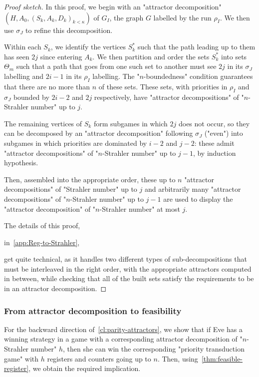 \documentclass[a4paper,UKenglish,cleveref, autoref, thm-restate]{lipics-v2021}
\newif\ificalp
\begin{document}
\begin{proof}[Proof sketch]
In this proof, we begin with an "attractor decomposition" $(H,A_0, (S_k,A_k,D_k)_{k<\kappa})$ of $G_I$, the graph $G$ labelled by the run $\rho_I$. We then use $\sigma_J$ to refine this decomposition.

Within each $S_k$, we identify the vertices $S^*_k$ such that the path leading up to them has seen $2j$ since entering $A_k$. We then partition and order the sets $S^*_k$ into sets $\Theta_m$ such that a path that goes from one such set to another must see $2j$ in its $\sigma_J$ labelling and $2i-1$ in its $\rho_I$ labelling. The "$n$-boundedness" condition guarantees that there are no more than $n$ of these sets. These sets, with priorities in $\rho_I$ and $\sigma_J$ bounded by $2i-2$ and $2j$ respectively, have "attractor decompositions" of "$n$-Strahler number" up to $j$.

The remaining vertices of $S_k$ form subgames in which $2j$ does not occur, so they can be decomposed by an "attractor decomposition" following $\sigma_J$ ("even") into subgames in which priorities are dominated by $i-2$ and $j-2$: these admit "attractor decompositions" of "$n$-Strahler number" up to $j-1$, by induction hypothesis.

Then, assembled into the appropriate order, these up to $n$ "attractor decompositions" of "Strahler number" up to $j$ and arbitrarily many "attractor decompositions" of "$n$-Strahler number" up to $j-1$ are used to display the "attractor decomposition" of "$n$-Strahler number" at most $j$.

The details of this proof, 
\ificalp
in the full version,
\else
in~\cref{app:Reg-to-Strahler},
\fi
get quite technical, as it handles two different types of sub-decompositions that must be interleaved in the right order, with the appropriate attractors computed in between, while checking that all of the built sets satisfy the requirements to be in an attractor decomposition.
\end{proof}


\subsubsection{From attractor decomposition to feasibility}

For the backward direction of~\cref{cl:parity-attractors}, we show that if Eve has a winning strategy in a game with a corresponding attractor decomposition of "$n$-Strahler number" $h$, then she can win the corresponding "priority transduction game" with $h$ registers and counters going up to $n$. Then, using~\cref{thm:feasible-register}, we obtain the required implication.
\end{document}
